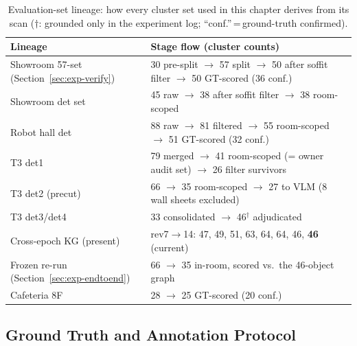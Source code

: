 \begin{table}[htbp]
\centering
\caption{Evaluation-set lineage: how every cluster set used in this chapter
derives from its scan ($\dagger$: grounded only in the experiment log;
``conf.''\,=\,ground-truth confirmed).}
\label{tab:sampleflow}
\small{}
\begin{tabularx}{\textwidth}{l X}
\toprule
\textbf{Lineage} & \textbf{Stage flow (cluster counts)} \\
\midrule
Showroom 57-set (Section~\ref{sec:exp-verify}) & 30 pre-split $\rightarrow$ 57 split $\rightarrow$ 50 after soffit filter $\rightarrow$ 50 GT-scored (36 conf.) \\
Showroom det set & 45 raw $\rightarrow$ 38 after soffit filter $\rightarrow$ 38 room-scoped \\
Robot hall det & 88 raw $\rightarrow$ 81 filtered $\rightarrow$ 55 room-scoped $\rightarrow$ 51 GT-scored (32 conf.) \\
T3 det1 & 79 merged $\rightarrow$ 41 room-scoped (= owner audit set) $\rightarrow$ 26 filter survivors \\
T3 det2 (precut) & 66 $\rightarrow$ 35 room-scoped $\rightarrow$ 27 to VLM (8 wall sheets excluded) \\
T3 det3/det4 & 33 consolidated $\rightarrow$ 46$^{\dagger}$ adjudicated \\
Cross-epoch KG (present) & rev7$\rightarrow$14: 47, 49, 51, 63, 64, 64, 46, \textbf{46} (current) \\
Frozen re-run (Section~\ref{sec:exp-endtoend}) & 66 $\rightarrow$ 35 in-room, scored vs.\ the 46-object graph \\
Cafeteria 8F & 28 $\rightarrow$ 25 GT-scored (20 conf.) \\
\bottomrule
\end{tabularx}
\end{table}

\subsection{Ground Truth and Annotation Protocol}
\label{subsec:gt}

